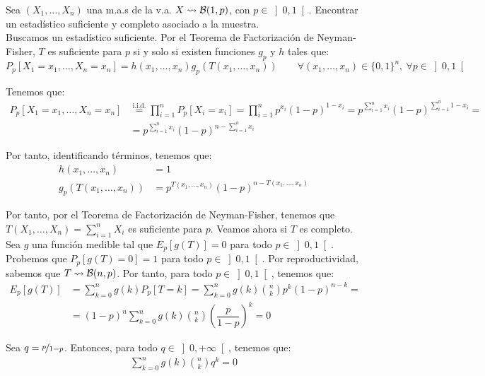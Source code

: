 \begin{ejemplo}
    Sea $(X_1, \ldots, X_n)$ una m.a.s de la v.a. $X \rightsquigarrow \mathcal{B}(1, p)$, con $p \in \left]0, 1\right[$. Encontrar un estadístico suficiente y completo asociado a la muestra.\\

    Buscamos un estadístico suficiente. Por el Teorema de Factorización de Neyman-Fisher, $T$ es suficiente para $p$ si y solo si existen funciones $g_p$ y $h$ tales que:
    \begin{equation*}
        P_p[X_1=x_1, \ldots, X_n=x_n] = h(x_1, \ldots, x_n) g_p(T(x_1, \ldots, x_n)) \qquad \forall (x_1, \ldots, x_n)\in\{0, 1\}^n,\ \forall p\in\left]0, 1\right[
    \end{equation*}

    Tenemos que:
    \begin{align*}
        P_p[X_1=x_1, \ldots, X_n=x_n] &\stackrel{\text{i.i.d.}}{=} \prod_{i=1}^n P_p[X_i=x_i] = \prod_{i=1}^n p^{x_i}(1-p)^{1-x_i} = p^{\sum\limits_{i=1}^n x_i}(1-p)^{\sum\limits_{i=1}^n 1-x_i} =\\&= p^{\sum\limits_{i=1}^n x_i}(1-p)^{n-\sum\limits_{i=1}^n x_i}
    \end{align*}

    Por tanto, identificando términos, tenemos que:
    \begin{align*}
        h(x_1, \ldots, x_n) &= 1 \\
        g_p(T(x_1, \ldots, x_n)) &= p^{T(x_1, \ldots, x_n)}(1-p)^{n-T(x_1, \ldots, x_n)}
    \end{align*}

    Por tanto, por el Teorema de Factorización de Neyman-Fisher, tenemos que $T(X_1, \ldots, X_n) = \sum\limits_{i=1}^n X_i$ es suficiente para $p$. Veamos ahora si $T$ es completo. Sea $g$ una función medible tal que $E_p[g(T)] = 0$ para todo $p\in\left]0, 1\right[$. Probemos que $P_p[g(T)=0] = 1$ para todo $p\in\left]0, 1\right[$. Por reproductividad, sabemos que $T \rightsquigarrow \mathcal{B}(n, p)$. Por tanto, para todo $p\in\left]0, 1\right[$, tenemos que:
    \begin{align*}
        E_p[g(T)] &= \sum\limits_{k=0}^n g(k) P_p[T=k] = \sum\limits_{k=0}^n g(k) \binom{n}{k} p^k (1-p)^{n-k}
        =\\&= (1-p)^n \sum\limits_{k=0}^n g(k) \binom{n}{k} \left(\dfrac{p}{1-p}\right)^k = 0
    \end{align*}

    Sea $q = \nicefrac{p}{1-p}$. Entonces, para todo $q\in\left]0, +\infty\right[$, tenemos que:
    \begin{align*}
        \sum\limits_{k=0}^n g(k) \binom{n}{k} q^k = 0
    \end{align*}


\end{ejemplo}
